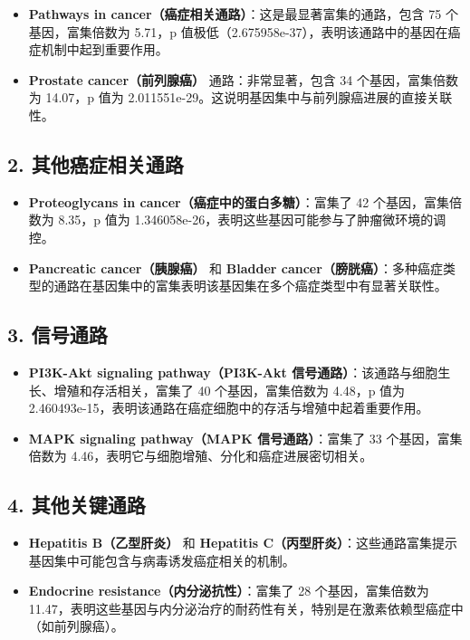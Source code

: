 \documentclass{article}
\begin{document}
\begin{itemize}
    \item \textbf{Pathways in cancer（癌症相关通路）}：这是最显著富集的通路，包含 75 个基因，富集倍数为 5.71，p 值极低（2.675958e-37），表明该通路中的基因在癌症机制中起到重要作用。
    \item \textbf{Prostate cancer（前列腺癌）} 通路：非常显著，包含 34 个基因，富集倍数为 14.07，p 值为 2.011551e-29。这说明基因集中与前列腺癌进展的直接关联性。
\end{itemize}

\subsection*{2. 其他癌症相关通路}

\begin{itemize}
    \item \textbf{Proteoglycans in cancer（癌症中的蛋白多糖）}：富集了 42 个基因，富集倍数为 8.35，p 值为 1.346058e-26，表明这些基因可能参与了肿瘤微环境的调控。
    \item \textbf{Pancreatic cancer（胰腺癌）} 和 \textbf{Bladder cancer（膀胱癌）}：多种癌症类型的通路在基因集中的富集表明该基因集在多个癌症类型中有显著关联性。
\end{itemize}

\subsection*{3. 信号通路}

\begin{itemize}
    \item \textbf{PI3K-Akt signaling pathway（PI3K-Akt 信号通路）}：该通路与细胞生长、增殖和存活相关，富集了 40 个基因，富集倍数为 4.48，p 值为 2.460493e-15，表明该通路在癌症细胞中的存活与增殖中起着重要作用。
    \item \textbf{MAPK signaling pathway（MAPK 信号通路）}：富集了 33 个基因，富集倍数为 4.46，表明它与细胞增殖、分化和癌症进展密切相关。
\end{itemize}

\subsection*{4. 其他关键通路}

\begin{itemize}
    \item \textbf{Hepatitis B（乙型肝炎）} 和 \textbf{Hepatitis C（丙型肝炎）}：这些通路富集提示基因集中可能包含与病毒诱发癌症相关的机制。
    \item \textbf{Endocrine resistance（内分泌抗性）}：富集了 28 个基因，富集倍数为 11.47，表明这些基因与内分泌治疗的耐药性有关，特别是在激素依赖型癌症中（如前列腺癌）。
\end{itemize}
\end{document}

